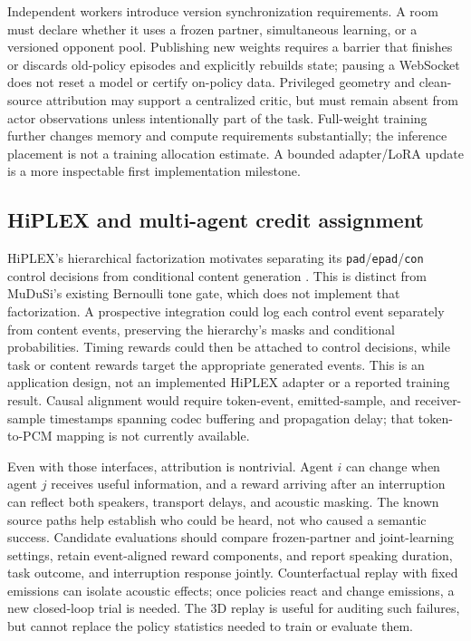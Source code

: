 \documentclass{article}
\newcommand{\code}[1]{\texttt{#1}}
\begin{document}
Independent workers introduce version synchronization requirements. A room must declare whether it uses a frozen partner, simultaneous learning, or a versioned opponent pool. Publishing new weights requires a barrier that finishes or discards old-policy episodes and explicitly rebuilds state; pausing a WebSocket does not reset a model or certify on-policy data. Privileged geometry and clean-source attribution may support a centralized critic, but must remain absent from actor observations unless intentionally part of the task. Full-weight training further changes memory and compute requirements substantially; the inference placement is not a training allocation estimate. A bounded adapter/LoRA update is a more inspectable first implementation milestone.

\subsection{HiPLEX and multi-agent credit assignment}
HiPLEX's hierarchical factorization motivates separating its \code{pad}/\code{epad}/\code{con} control decisions from conditional content generation \citep{jung2026hiplex}. This is distinct from MuDuSi's existing Bernoulli tone gate, which does not implement that factorization. A prospective integration could log each control event separately from content events, preserving the hierarchy's masks and conditional probabilities. Timing rewards could then be attached to control decisions, while task or content rewards target the appropriate generated events. This is an application design, not an implemented HiPLEX adapter or a reported training result. Causal alignment would require token-event, emitted-sample, and receiver-sample timestamps spanning codec buffering and propagation delay; that token-to-PCM mapping is not currently available.

Even with those interfaces, attribution is nontrivial. Agent $i$ can change when agent $j$ receives useful information, and a reward arriving after an interruption can reflect both speakers, transport delays, and acoustic masking. The known source paths help establish who could be heard, not who caused a semantic success. Candidate evaluations should compare frozen-partner and joint-learning settings, retain event-aligned reward components, and report speaking duration, task outcome, and interruption response jointly. Counterfactual replay with fixed emissions can isolate acoustic effects; once policies react and change emissions, a new closed-loop trial is needed. The 3D replay is useful for auditing such failures, but cannot replace the policy statistics needed to train or evaluate them.
\end{document}
